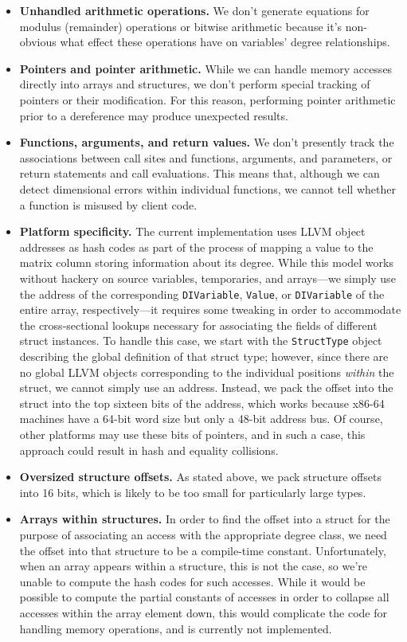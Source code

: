 \documentclass[12pt]{article}
\begin{document}
\begin{itemize}
\item \textbf{Unhandled arithmetic operations.}
We don't generate equations for modulus (remainder) operations or bitwise arithmetic because it's non-obvious what effect these operations have on variables' degree relationships.

\item \textbf{Pointers and pointer arithmetic.}
While we can handle memory accesses directly into arrays and structures, we don't perform special tracking of pointers or their modification.
For this reason, performing pointer arithmetic prior to a dereference may produce unexpected results.

\item \textbf{Functions, arguments, and return values.}
We don't presently track the associations between call sites and functions, arguments, and parameters, or return statements and call evaluations.
This means that, although we can detect dimensional errors within individual functions, we cannot tell whether a function is misused by client code.

\item \textbf{Platform specificity.}
The current implementation uses LLVM object addresses as hash codes as part of the process of mapping a value to the matrix column storing information about its degree.
While this model works without hackery on source variables, temporaries, and arrays---we simply use the address of the corresponding \texttt{DIVariable}, \texttt{Value}, or \texttt{DIVariable} of the entire array, respectively---it requires some tweaking in order to accommodate the cross-sectional lookups necessary for associating the fields of different struct instances.
To handle this case, we start with the \texttt{StructType} object describing the global definition of that struct type; however, since there are no global LLVM objects corresponding to the individual positions \textit{within} the struct, we cannot simply use an address.
Instead, we pack the offset into the struct into the top sixteen bits of the address, which works because x86-64 machines have a 64-bit word size but only a 48-bit address bus.
Of course, other platforms may use these bits of pointers, and in such a case, this approach could result in hash and equality collisions.

\item \textbf{Oversized structure offsets.}
As stated above, we pack structure offsets into 16 bits, which is likely to be too small for particularly large types.

\item \textbf{Arrays within structures.}
In order to find the offset into a struct for the purpose of associating an access with the appropriate degree class, we need the offset into that structure to be a compile-time constant.
Unfortunately, when an array appears within a structure, this is not the case, so we're unable to compute the hash codes for such accesses.
While it would be possible to compute the partial constants of accesses in order to collapse all accesses within the array element down, this would complicate the code for handling memory operations, and is currently not implemented.
\end{itemize}
\end{document}
